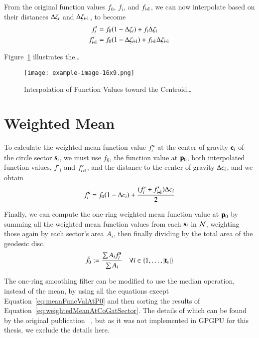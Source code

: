 From the original function values $f_0$, $f_i$, and $f_{\sipo}$, we can now interpolate based on their distances $\Delta\zeta_i$ and $\Dz_{\sipo}$, to become
\begin{align}
	f'_i & = f_0(1 - \Dz_i) + f_i\Dz_i
	\label{eq:interpolatedFi} \\
	f'_{\sipo} & = f_0(1 - \Dz_{\sipo}) + f_{\sipo}\Dz_{\sipo}
	\label{eq:interpolatedFip1}
\end{align}%
%

Figure~\ref{fig:interpolation} illustrates the\dots
\begin{figure}[ht]
\ffigbox
	{\texttt{[image: example-image-16x9.png]}}
	{\caption[Interpolation of Function Values toward the Centroid]{Interpolation of Function Values toward the Centroid\ldots}\label{fig:interpolation}}
\end{figure}
%
%
%
%
%
\section{Weighted Mean}
\label{ch4sWM}
To calculate the weighted mean function value $f^{\mathbf{s}}_i$ at the center of gravity $\mathbf{c}_i$ of the circle sector $\mathbf{s}_i$, we must use $f_0$, the function value at $\mathbf{p}_0$, both interpolated function values, $f'_i$ and $f'_{\sipo}$, and the distance to the center of gravity $\Delta c_i$, and we obtain
\begin{equation}
	f^\bs_i = f_0(1 - \Dc_i) + \frac{(f'_i + f'_{\sipo})\Dc_i}{2}
	\label{eq:weightedMeanAtCoGatSector}
\end{equation}%
%

Finally, we can compute the one-ring weighted mean function value at $\mathbf{p}_0$ by summing all the weighted mean function values from each $\mathbf{s}_i$ in $\mathcal{N}$, weighting those again by each sector's area $A_i$, then finally dividing by the total area of the geodesic disc.
\begin{equation}
	\bar{f}_0 := \frac{\sum A_if^{\mathbf{s}}_i}{\sum A_i} \quad \forall i \in \{1,\ldots,|\mathbf{t}_v|\}
	\label{eq:meanFuncValAtP0}
\end{equation}%
%

The one-ring smoothing filter can be modified to use the median operation, instead of the mean, by using all the equations except Equation~\ref{eq:meanFuncValAtP0} and then sorting the results of Equation~\ref{eq:weightedMeanAtCoGatSector}. The details of which can be found by the original publication ~\cite[s.~3.2]{Mara17}, but as it was not implemented in GPGPU for this thesis, we exclude the details here.

